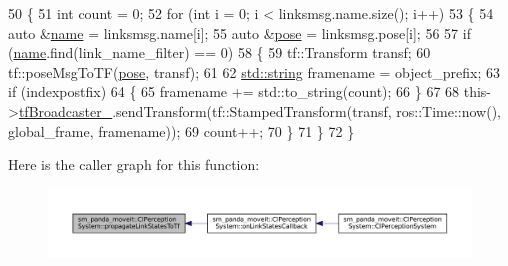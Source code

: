 \begin{DoxyCode}
50     \{
51         \textcolor{keywordtype}{int} count = 0;
52         \textcolor{keywordflow}{for} (\textcolor{keywordtype}{int} i = 0; i < linksmsg.name.size(); i++)
53         \{
54             \textcolor{keyword}{auto} &\hyperlink{namespaceinteractive__marker_a447655961b3d3ca3c5a2a9d3d769436d}{name} = linksmsg.name[i];
55             \textcolor{keyword}{auto} &\hyperlink{namespaceinteractive__marker_a06e4691dc5f93e0da6dc9a6efa8d99b5}{pose} = linksmsg.pose[i];
56 
57             \textcolor{keywordflow}{if} (\hyperlink{namespaceinteractive__marker_a447655961b3d3ca3c5a2a9d3d769436d}{name}.find(link\_name\_filter) == 0)
58             \{
59                 tf::Transform transf;
60                 tf::poseMsgToTF(\hyperlink{namespaceinteractive__marker_a06e4691dc5f93e0da6dc9a6efa8d99b5}{pose}, transf);
61 
62                 \hyperlink{namespacetesting_1_1internal_a8e8ff5b11e64078831112677156cb111}{std::string} framename = object\_prefix;
63                 \textcolor{keywordflow}{if} (indexpostfix)
64                 \{
65                     framename += std::to\_string(count);
66                 \}
67 
68                 this->\hyperlink{classsm__panda__moveit_1_1ClPerceptionSystem_a72da0ac3f9215b3a2a78f4bb02442844}{tfBroadcaster\_}.sendTransform(tf::StampedTransform(transf, 
      ros::Time::now(), global\_frame, framename));
69                 count++;
70             \}
71         \}
72     \}
\end{DoxyCode}
Here is the caller graph for this function\+:
\nopagebreak
\begin{figure}[H]
\begin{center}
\leavevmode
\includegraphics[width=350pt]{classsm__panda__moveit_1_1ClPerceptionSystem_a0c02770eff276808972e341c939a9e97_icgraph}
\end{center}
\end{figure}
\mbox{\label{classsm__panda__moveit_1_1ClPerceptionSystem_aa3a4c77ca5c046b2f07d775bf3838f4f}} 
